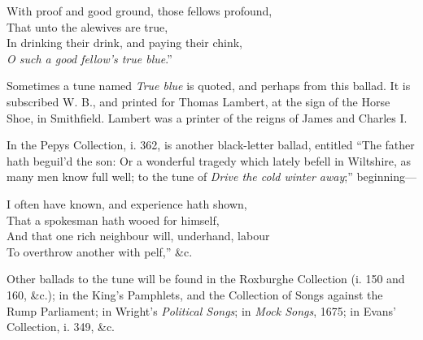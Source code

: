 \pagebreak

\settowidth{\versewidth}{With proof and good ground, those fellows profound,}
\begin{scverse}
\begin{altverse}
With proof and good ground, those fellows profound,\\
That unto the alewives are true,\\
In drinking their drink, and paying their chink,\\
\textit{O such a good fellow's true blue}.”
\end{altverse}
\end{scverse}
Sometimes a tune named \textit{True blue} is quoted, and perhaps from this ballad. It is
subscribed W. B., and printed for Thomas Lambert, at the sign of the Horse
Shoe, in Smithfield. Lambert was a printer of the reigns of James and Charles I.

In the Pepys Collection, i. 362, is another black-letter ballad, entitled “The
father hath beguil’d the son: Or a wonderful tragedy which lately befell in Wiltshire,
as many men know full well; to the tune of \textit{Drive the cold winter away};”
beginning—
\settowidth{\versewidth}{“I often have known, and experience hath shown,}
\begin{scverse}
\begin{altverse}
I often have known, and experience hath shown,\\
That a spokesman hath wooed for himself,\\
And that one rich neighbour will, underhand, labour\\
To overthrow another with pelf,” \&c.
\end{altverse}
\end{scverse}
Other ballads to the tune will be found in the Roxburghe Collection (i. 150 and
160, \&c.); in the King’s Pamphlets, and the Collection of Songs against the
Rump Parliament; in Wright’s \textit{Political Songs}; in \textit{Mock Songs}, 1675; in Evans’
Collection, i. 349, \&c.


\smallskip


\pagebreak

